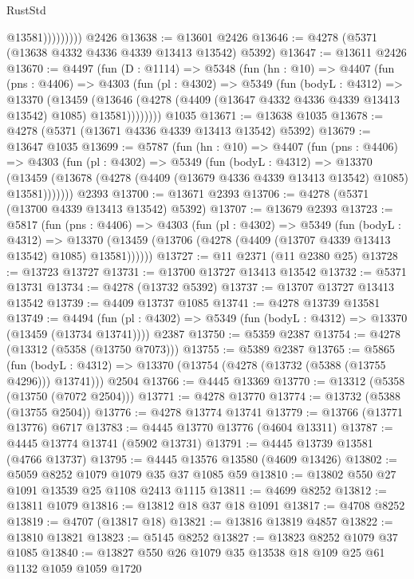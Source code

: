 \begin{lexlean}{RustStd}
\begin{coremodule}
                      @13581)))))))))
    @2426
@13638 := @13601 @2426
@13646 := @4278 (@5371 (@13638 @4332 @4336 @4339 @13413 @13542) @5392)
@13647 := @13611 @2426
@13670 := @4497
    (fun (D : @1114) =>
    @5348
      (fun (hn : @10) =>
      @4407
        (fun (pns : @4406) =>
        @4303
          (fun (pl : @4302) =>
          @5349
            (fun (bodyL : @4312) =>
            @13370
              (@13459
                (@13646 (@4278 (@4409 (@13647 @4332 @4336 @4339 @13413 @13542) @1085) @13581))))))))
    @1035
@13671 := @13638 @1035
@13678 := @4278 (@5371 (@13671 @4336 @4339 @13413 @13542) @5392)
@13679 := @13647 @1035
@13699 := @5787
    (fun (hn : @10) =>
    @4407
      (fun (pns : @4406) =>
      @4303
        (fun (pl : @4302) =>
        @5349
          (fun (bodyL : @4312) =>
          @13370
            (@13459 (@13678 (@4278 (@4409 (@13679 @4336 @4339 @13413 @13542) @1085) @13581)))))))
    @2393
@13700 := @13671 @2393
@13706 := @4278 (@5371 (@13700 @4339 @13413 @13542) @5392)
@13707 := @13679 @2393
@13723 := @5817
    (fun (pns : @4406) =>
    @4303
      (fun (pl : @4302) =>
      @5349
        (fun (bodyL : @4312) =>
        @13370 (@13459 (@13706 (@4278 (@4409 (@13707 @4339 @13413 @13542) @1085) @13581))))))
@13727 := @11 @2371 (@11 @2380 @25)
@13728 := @13723 @13727
@13731 := @13700 @13727 @13413 @13542
@13732 := @5371 @13731
@13734 := @4278 (@13732 @5392)
@13737 := @13707 @13727 @13413 @13542
@13739 := @4409 @13737 @1085
@13741 := @4278 @13739 @13581
@13749 := @4494
    (fun (pl : @4302) => @5349 (fun (bodyL : @4312) => @13370 (@13459 (@13734 @13741))))
    @2387
@13750 := @5359 @2387
@13754 := @4278 (@13312 (@5358 (@13750 @7073)))
@13755 := @5389 @2387
@13765 := @5865
    (fun (bodyL : @4312) => @13370 (@13754 (@4278 (@13732 (@5388 (@13755 @4296))) @13741)))
    @2504
@13766 := @4445 @13369
@13770 := @13312 (@5358 (@13750 (@7072 @2504)))
@13771 := @4278 @13770
@13774 := @13732 (@5388 (@13755 @2504))
@13776 := @4278 @13774 @13741
@13779 := @13766 (@13771 @13776) @6717
@13783 := @4445 @13770 @13776 (@4604 @13311)
@13787 := @4445 @13774 @13741 (@5902 @13731)
@13791 := @4445 @13739 @13581 (@4766 @13737)
@13795 := @4445 @13576 @13580 (@4609 @13426)
@13802 := @5059 @8252 @1079 @1079 @35 @37 @1085 @59
@13810 := @13802 @550 @27 @1091 @13539 @25 @1108 @2413 @1115
@13811 := @4699 @8252
@13812 := @13811 @1079
@13816 := @13812 @18 @37 @18 @1091
@13817 := @4708 @8252
@13819 := @4707 (@13817 @18)
@13821 := @13816 @13819 @4857
@13822 := @13810 @13821
@13823 := @5145 @8252
@13827 := @13823 @8252 @1079 @37 @1085
@13840 := @13827 @550 @26 @1079 @35 @13538 @18 @109 @25 @61 @1132 @1059 @1059 @1720

\end{coremodule}
\end{lexlean}
